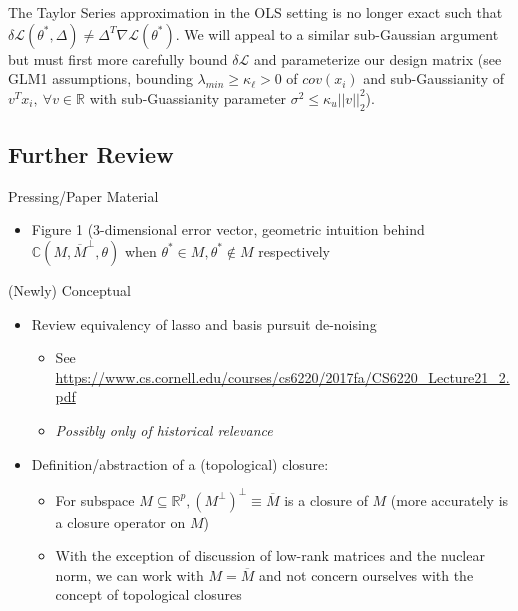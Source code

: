 \documentclass[11pt]{article}
\begin{document}
The Taylor Series approximation in the OLS setting is no longer exact such that $\delta\mathcal{L}(\theta^*, \Delta) \neq \Delta^T \nabla \mathcal{L}(\theta^*)$. We will appeal to a similar sub-Gaussian argument but must first more carefully bound $\delta\mathcal{L}$ and parameterize our design matrix (see GLM1 assumptions, bounding $\lambda_{min}\geq \kappa_\ell > 0$ of $cov(x_i)$ and sub-Gaussianity of $v^T x_i, \ \forall v \in \mathbb{R}$ with sub-Guassianity parameter $\sigma^2\leq \kappa_u ||v||_2^2$). 

\newpage  
\subsection*{Further Review}

Pressing/Paper Material 
\begin{itemize}	
    \item Figure 1 (3-dimensional error vector, geometric intuition behind $\mathbb{C}(M, \overline{M}^\perp, \theta)$ when $\theta^* \in M, \theta^*\not\in M$ respectively 
\end{itemize}

(Newly) Conceptual
\begin{itemize}
    \item Review equivalency of lasso and basis pursuit de-noising
    \begin{itemize}
        \item See \url{https://www.cs.cornell.edu/courses/cs6220/2017fa/CS6220_Lecture21_2.pdf}
        \item {\it Possibly only of historical relevance}
    \end{itemize}
    \item Definition/abstraction of a (topological) closure:
    \begin{itemize}
        \item For subspace $M \subseteq \mathbb{R}^p, \left(M^\perp \right)^\perp \equiv \overline{M}$ is a closure of $M$ (more accurately is a closure operator on $M$) 
        \item With the exception of discussion of low-rank matrices and the nuclear norm, we can work with $M = \overline{M}$ and not concern ourselves with the concept of topological closures 
    \end{itemize}
\end{itemize}
\end{document}
